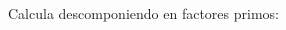 \documentclass[addpoints,spanish, 12pt,a4paper]{exam}
\renewcommand*\half{.5}
\begin{document}
\begin{questions}



    \question[1\half] Calcula descomponiendo en factores primos:
    \begin{multicols}{2}
    \begin{parts}

\end{parts}
\end{multicols}
\end{questions}
\end{document}
